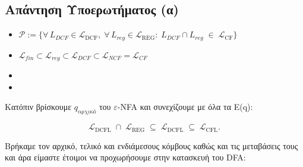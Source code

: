 \subsection{Απάντηση Υποερωτήματος (α)}
\label{ssec:Solution_3.1}
\doublespacing

\begin{itemize}
	\itemsep0em

	\item $\mathcal{P} := \{\forall\,L_{DCF}\in\mathcal L_{\mathrm{DCF}},\;\forall\,L_{reg}\in\mathcal
	L_{\mathrm{REG}}:
	\;L_{DCF}\cap L_{reg}\;\in\;\mathcal L_{\mathrm{CF}}\}$


	\item $\mathcal{L}_{fin} \subset \mathcal{L}_{reg} \subset \mathcal{L}_{DCF} \subset \mathcal{L}_{NCF} =
	\mathcal{L}_{CF}$

	\item

	\item
\end{itemize}
\par
Κατόπιν βρίσκουμε $q_{\text{αρχικό}}$ του $ε$-NFA και συνεχίζουμε με όλα τα E(q):
\hfill \break
\setlength{\arrayrulewidth}{0.5mm}
\setlength{\tabcolsep}{18pt}
\renewcommand{\arraystretch}{1}

\[
\mathcal L_{\mathrm{DCFL}}
\;\cap\;
\mathcal L_{\mathrm{REG}}
\;\subseteq\;
\mathcal L_{\mathrm{DCFL}}
\;\subseteq\;
\mathcal L_{\mathrm{CFL}}.
\]


\par
Βρήκαμε τον αρχικό, τελικό και ενδιάμεσους κόμβους καθώς και τις μεταβάσεις τους και άρα είμαστε έτοιμοι να
προχωρήσουμε στην κατασκευή του DFA:

